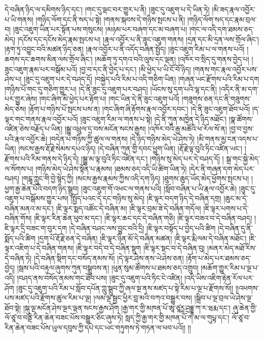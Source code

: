 དེ་བཞིན་ཉིད་ལ་དམིགས་ཉིད་དང་། །གང་དུ་ལྡང་བར་གྱུར་པ་ནི། །ཟུང་དུ་འཇུག་པ་དེ་ཡིན་ཏེ། །མི་ཟད་རྣལ་འབྱོར་པ་ཡི་གནས། །གཉིད་ལོག་དང་ནི་སད་པ་སྟེ། །གནས་སྐབས་དེ་གཉིས་སྤངས་པ་ནི། །གཉིད་ལོག་སད་དང་རྣམ་བྲལ་བ། །ཟུང་འཇུག་ཡིན་པར་སྟོན་པས་གསུངས། །མཉམ་པར་བཞག་དང་མ་བཞག་པ། །གང་ལ་འདི་དག་ཐམས་ཅད་མེད། །དངོས་དང་དངོས་མེད་རྣམ་སྤངས་པ། །རྣལ་འབྱོར་པ་ནི་ཟུང་འཇུག་གནས། །དྲན་དང་མི་དྲན་ལས་གྲོལ་ཞིང་། །རྟག་ཏུ་འབྱུང་བའི་མཚན་ཉིད་ཅན། །རྣལ་འབྱོར་པ་ནི་འདོད་བཞིན་སྤྱོད། །ཟུང་འཇུག་རིམ་པ་ལ་གནས་པའོ། །ཆགས་དང་ཆགས་མིན་ལས་གྲོལ་ཞིང་། །མཆོག་ཏུ་དགའ་བའི་ལུས་དང་ལྡན། །འཁོར་བ་སྲིད་དུ་གནས་བྱེད་པ། །ཟུང་འཇུག་རྣམ་པར་བསྒོམ་པའོ། །བྱ་བ་དང་ནི་བྱེད་པ་དང་། །མི་ཕྱེད་པ་ཡི་ངོ་བོ་ཉིད། །གནས་གང་རྣལ་འབྱོར་པས་ཤེས་པ། །ཟུང་དུ་འཇུག་པར་དེ་བཤད་དོ། །བསྐྱེད་པའི་རིམ་པ་འདི་གཅིག་ཡིན། །གཞན་ཡང་རྫོགས་པའི་རིམ་པ་དག །གཉིས་པོ་གང་དུ་གཅིག་གྱུར་པ། །དེ་ནི་ཟུང་དུ་འཇུག་པར་བཤད། །ཡོངས་སུ་དག་པའི་ལྷ་དང་ནི། །འདིར་ནི་མ་དག་པར་གྱུར་ཞེས། །གང་ཞིག་མི་ཕྱེད་པར་རྟོག་པ། །གང་ཡིན་དེ་ནི་ཟུང་འཇུག་པའོ། །གཟུགས་ཅན་དང་ནི་གཟུགས་མེད་ཅེས། །རྟོག་པ་གཉིས་པོ་སྤངས་པས་ན། །གང་ཞིག་ཞི་རྟོགས་རྣལ་འབྱོར་དབང་། །དེ་ནི་ཟུང་འཇུག་ཐོབ་པའོ། །ད་ལྟར་གང་གནས་རྣལ་འབྱོར་པའོ། །ཟུང་འཇུག་རིམ་ལ་གནས་པ་སྟེ། །དེ་ནི་ཀུན་མཁྱེན་དེ་ཉིད་མཐོང་། །སྣ་ཚོགས་འཛིན་ཅེས་བརྗོད་པ་ཡིན། །སྒྱུ་འཕྲུལ་དྲ་བས་མངོན་སངས་རྒྱས། །འཁོར་བའི་རྒྱ་མཚོའི་ཕ་རོལ་སོ་ན། །བྱ་བ་བྱས་པའི་རྣལ་འབྱོར་ཆེ། །བདེན་པ་གཉིས་ཀྱི་ཚུལ་ལ་གནས། །དེ་ཉིད་གཉིས་མེད་ཡེ་ཤེས་ཏེ། །མི་གནས་མྱ་ངན་འདས་པ་ཡིན། །སངས་རྒྱས་རྡོ་རྗེ་སེམས་དཔའ་ཉིད། །དེ་བཞིན་ཀུན་གྱི་དབང་ཕྱུག་ཡིན། །རྡོ་རྗེ་ལྟ་བུའི་ཏིང་འཛིན་ཡང་། །རྫོགས་པའི་རིམ་གནས་དེ་ཉིད་དེ། །སྒྱུ་མ་ལྟ་བུའི་ཏིང་འཛིན་དང་། །གཉིས་སུ་མེད་པར་དེ་བཤད་དོ། །
སྒྲ་གང་སྐྱེ་མེད་ལ་སོགས་པ། །གཉིས་མེད་ཡེ་ཤེས་སྟོན་པ་རྣམས། །ཐམས་ཅད་འདི་ཡི་ཚིག་ཡིན་ཏེ། །དེར་ནི་གཞན་དག་མེད་པར་བཤད། །གངྒཱ་ཀླུང་གི་བྱེ་སྙེད་ཀྱི། །སངས་རྒྱས་རྣམས་ཀྱིས་འདི་དག་ཉིད། །ཐུགས་ཆུད་ཡོད་མེད་ཕྱོགས་སྤངས་པ། །ཕྱག་རྒྱ་ཆེན་པོའི་བདག་ཉིད་སྒྲུབ། །ཟུང་འཇུག་གོ་འཕང་ལ་གནས་པའི། །སློབ་བཞིན་པ་ཡི་རྣལ་འབྱོར་ཆེ། །ཟུང་དུ་འཇུག་པ་བསྒོམས་གྱུར་པས། །སྤྱོད་པའང་དེ་དང་གཉིས་སུ་མེད། །ཇི་ལྟར་བདག་ཉིད་དེ་བཞིན་དགྲ། །ཆུང་མ་དེ་བཞིན་མནའ་མ་དང་། །ཇི་ལྟར་སྨད་འཚོང་དེ་བཞིན་མ། །ཇི་ལྟར་བྲམ་ཟེ་དེ་བཞིན་གདོལ། །ཇི་ལྟར་པགས་པ་དེ་བཞིན་གོས། །ཇི་ལྟར་རིན་ཆེན་ཕུབ་མ་དང་། །ཇི་ལྟར་ཆང་དང་དེ་བཞིན་གཅི། །ཇི་ལྟར་བཟའ་བ་དེ་བཞིན་བཤད། །ཇི་ལྟར་དྲི་བཟང་ག་བུར་དག །དེ་བཞིན་བཤང་ལས་བྱུང་བའི་དྲི། །ཇི་ལྟར་བསྟོད་པ་བྱེད་པའི་ཚིག །དེ་བཞིན་དུ་ནི་སྨོད་པའི་ཚིག །དྲག་པོ་རྡོ་རྗེ་ཅན་དེ་བཞིན། །ཇི་ལྟར་ཉིན་མོ་དེ་བཞིན་མཚན། །ཇི་ལྟར་རྨི་ལམ་དེ་བཞིན་མཐོང་། །ཇི་ལྟར་འཇིག་པ་དེ་བཞིན་གནས། །ཇི་ལྟར་བདེ་བ་དེ་བཞིན་སྡུག །ཇི་ལྟར་སྡང་བ་དེ་བཞིན་བུ། །མནར་མེད་མཐོ་རིས་དེ་བཞིན་ཏེ། །དེ་བཞིན་སྡིག་དང་བསོད་ནམས་སོ། །དེ་ལྟར་ཤེས་ནས་ཡེ་ཤེས་ཅན། །རྟོག་པ་མེད་པར་ཐམས་ཅད་བྱེད། །སྦས་པའི་བརྟུལ་ཞུགས་ཀུན་བསྒྲུབས་ན། །ཕུན་སུམ་ཚོགས་པ་ཐམས་ཅད་འགྲུབ། །མཆོག་གྱུར་རིམ་པ་ལྔ་པ་འདི། །བཤད་ནས་བསོད་ནམས་གང་ཐོབ་པས། །ཟུང་དུ་འཇུག་པའི་ཏིང་ངེ་འཛིན། །འདི་ཡིས་འཇིག་རྟེན་རོལ་པར་ཤོག །ཟུང་དུ་འཇུག་པའི་རིམ་པ་སློབ་དཔོན་ཀླུ་སྒྲུབ་ཀྱི་ཞལ་སྔ་ནས་མཛད་པ་སྟེ་རིམ་པ་ལྔ་པ་རྫོགས་སོ།། །།འཕགས་པས་མཛད་པའི་རྫོགས་ཚུལ་རིམ་པ་ལྔ། །ལམ་ལྔ་སྦྱང་ཕྱིར་བླ་མའི་བཀའ་བསྒྱུར་བས། །སྒྲིབ་པ་ལྔ་བྲལ་ཡེ་ཤེས་ལྔ་ཐོབ་སྟེ། །སྐུ་ལྔ་མངོན་ཤེས་ལྔར་ལྡན་སངས་རྒྱས་ཤོག །རྒྱ་གར་གྱི་མཁན་པོ་ཨཱ་ཙཱཪྻ་ཤྲདྡྷ་ཀ་ར་ཝརྨ་དང་། ཞུ་ཆེན་གྱི་ལོ་ཙཱ་བ་བནྡེ་རིན་ཆེན་བཟང་པོས་བསྒྱུར་ཅིང་ཞུས་ཏེ། སླད་ཀྱི་རྒྱ་གར་གྱི་མཁན་པོ་ཀ་མ་ལ་གུཔྟ་དང་། ལོ་ཙཱ་བ་རིན་ཆེན་བཟང་པོས་ཡུལ་དབུས་ཀྱི་དཔེ་དང་ཡང་གཏུགས་ཏེ་གཏན་ལ་ཕབ་པའོ།། །།